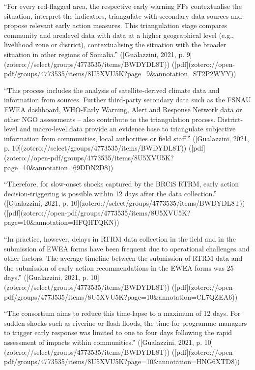 {{“For every red-flagged area, the respective early warning FPs contextualise the situation, interpret the indicators, triangulate with secondary data sources and propose relevant early action measures. This triangulation stage compares community and arealevel data with data at a higher geographical level (e.g., livelihood zone or district), contextualising the situation with the broader situation in other regions of Somalia.” ([Gualazzini, 2021, p. 9](zotero://select/groups/4773535/items/BWDYDL8T)) ([pdf](zotero://open-pdf/groups/4773535/items/8U5XVU5K?page=9&annotation=ST2P2WYY))

“This process includes the analysis of satellite-derived climate data and information from sources. Further third-party secondary data such as the FSNAU EWEA dashboard, WHO-Early Warning, Alert and Response Network data or other NGO assessments – also contribute to the triangulation process. District-level and macro-level data provide an evidence base to triangulate subjective information from communities, local authorities or field staff.” ([Gualazzini, 2021, p. 10](zotero://select/groups/4773535/items/BWDYDL8T)) ([pdf](zotero://open-pdf/groups/4773535/items/8U5XVU5K?page=10&annotation=69DDN2D8))

“Therefore, for slow-onset shocks captured by the BRCiS RTRM, early action decision-triggering is possible within 12 days after the data collection.” ([Gualazzini, 2021, p. 10](zotero://select/groups/4773535/items/BWDYDL8T)) ([pdf](zotero://open-pdf/groups/4773535/items/8U5XVU5K?page=10&annotation=HFQHTQKN))

“In practice, however, delays in RTRM data collection in the field and in the submission of EWEA forms have been frequent due to operational challenges and other factors. The average timeline between the submission of RTRM data and the submission of early action recommendations in the EWEA forms was 25 days.” ([Gualazzini, 2021, p. 10](zotero://select/groups/4773535/items/BWDYDL8T)) ([pdf](zotero://open-pdf/groups/4773535/items/8U5XVU5K?page=10&annotation=CL7QZEA6))

“The consortium aims to reduce this time-lapse to a maximum of 12 days. For sudden shocks such as riverine or flash floods, the time for programme managers to trigger early response was limited to one to four days following the rapid assessment of impacts within communities.” ([Gualazzini, 2021, p. 10](zotero://select/groups/4773535/items/BWDYDL8T)) ([pdf](zotero://open-pdf/groups/4773535/items/8U5XVU5K?page=10&annotation=HNG6XTD8))


}}
